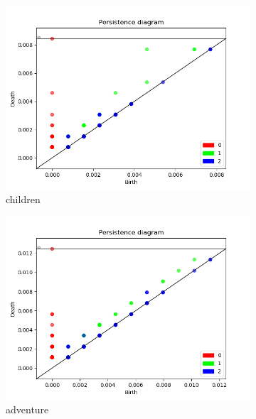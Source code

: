 \documentclass[fleqn]{article}
\begin{document}
\begin{figure}
\begin{subfigure}[t]{0.425\textwidth}
			\includegraphics[width=\textwidth]{figures/stopwords_excluded/children.png}
			\caption{children}
			\label{fig:sw:children}
		\end{subfigure}\hfill
		\begin{subfigure}[t]{0.425\textwidth}
			\includegraphics[width=\textwidth]{figures/stopwords_excluded/adventure.png}
			\caption{adventure}
			\label{fig:sw:adventure}
		\end{subfigure}\hfill
		\\
		\begin{subfigure}[t]{0.425\textwidth}

\end{subfigure}
\end{figure}
\end{document}
